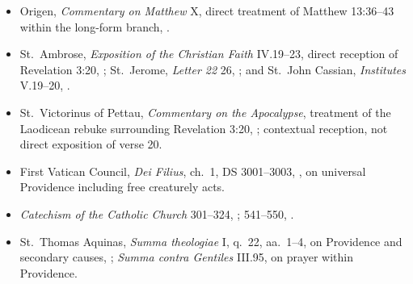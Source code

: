 \begin{deepstudy}
{\begin{itemize}[itemsep=0em,topsep=0.15em,parsep=0pt]
\item Origen, \emph{Commentary on Matthew} X, direct treatment of Matthew 13:36--43 within the long-form branch, .
\item St.~Ambrose, \emph{Exposition of the Christian Faith} IV.19--23, direct reception of Revelation 3:20, ; St.~Jerome, \emph{Letter 22} 26, ; and St.~John Cassian, \emph{Institutes} V.19--20, .
\item St.~Victorinus of Pettau, \emph{Commentary on the Apocalypse}, treatment of the Laodicean rebuke surrounding Revelation 3:20, ; contextual reception, not direct exposition of verse 20.
\item First Vatican Council, \emph{Dei Filius}, ch.~1, DS 3001--3003, , on universal Providence including free creaturely acts.
\item \emph{Catechism of the Catholic Church} 301--324, ; 541--550, .
\item St.~Thomas Aquinas, \emph{Summa theologiae} I, q.~22, aa.~1--4, on Providence and secondary causes, ; \emph{Summa contra Gentiles} III.95, on prayer within Providence.
\end{itemize}}


\end{deepstudy}
